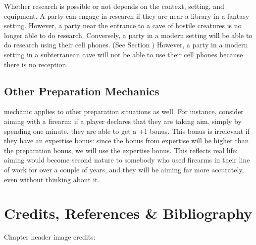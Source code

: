 Whether research is possible or not depends on the context, setting, and equipment.
A party can engage in research if they are near a library in a fantasy setting.
However, a party near the entrance to a cave of hostile creatures is no longer able to do research.
Conversely, a party in a modern setting will be able to do research using their cell phones. (See Section )
However, a party in a modern setting in a subterranean cave will not be able to use their cell phones because there is no reception.


\subsection{Other Preparation Mechanics}

 mechanic applies to other preparation situations as well.
For instance, consider aiming with a firearm: if a player declares that they are taking aim,
simply by spending one minute, they are able to get a +1 bonus.
This bonus is irrelevant if they have an expertise bonus: since the bonus from expertise
will be higher than the preparation bonus, we will use the expertise bonus.
This reflects real life: aiming would become second nature to somebody who used firearms
in their line of work for over a couple of years, and they will be aiming far more accurately,
even without thinking about it.

\section*{Credits, References \& Bibliography}

Chapter header image credits: \cite{dice_image}

\printbibliography[heading=none]
